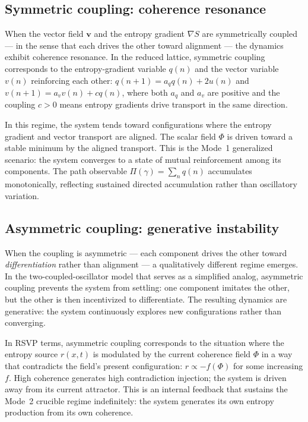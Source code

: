 \documentclass[12pt, oneside]{memoir}
\newcommand{\bv}{\mathbf{v}}
\newcommand{\aq}{a_q}
\newcommand{\av}{a_v}
\begin{document}
\subsection{Symmetric coupling: coherence resonance}

When the vector field $\bv$ and the entropy gradient $\nabla S$ are symmetrically
coupled — in the sense that each drives the other toward alignment — the dynamics
exhibit coherence resonance.  In the reduced lattice, symmetric coupling corresponds to
the entropy-gradient variable $q(n)$ and the vector variable $v(n)$ reinforcing each
other: $q(n+1) = \aq q(n) + 2u(n)$ and $v(n+1) = \av v(n) + c q(n)$, where both
$\aq$ and $\av$ are positive and the coupling $c > 0$ means entropy gradients drive
transport in the same direction.

In this regime, the system tends toward configurations where the entropy gradient and
vector transport are aligned.  The scalar field $\Phi$ is driven toward a stable
minimum by the aligned transport.  This is the Mode~1 generalized scenario: the system
converges to a state of mutual reinforcement among its components.  The path observable
$\Pi(\gamma) = \sum_n q(n)$ accumulates monotonically, reflecting sustained directed
accumulation rather than oscillatory variation.

\subsection{Asymmetric coupling: generative instability}

When the coupling is asymmetric — each component drives the other toward
\emph{differentiation} rather than alignment — a qualitatively different regime emerges.
In the two-coupled-oscillator model that serves as a simplified analog, asymmetric
coupling prevents the system from settling: one component imitates the other, but the
other is then incentivized to differentiate.  The resulting dynamics are generative:
the system continuously explores new configurations rather than converging.

In RSVP terms, asymmetric coupling corresponds to the situation where the entropy source
$r(x,t)$ is modulated by the current coherence field $\Phi$ in a way that contradicts
the field's present configuration: $r \propto -f(\Phi)$ for some increasing $f$.  High
coherence generates high contradiction injection; the system is driven away from its
current attractor.  This is an internal feedback that sustains the Mode~2 crucible
regime indefinitely: the system generates its own entropy production from its own
coherence.
\end{document}
